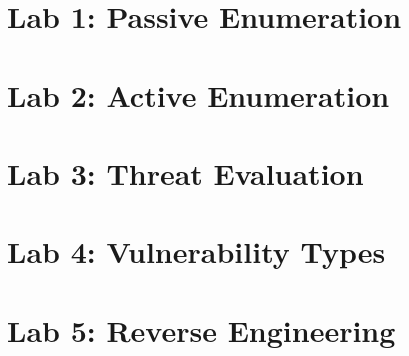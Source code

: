 \documentclass[oneside,openright,titlepage,numbers=noenddot,headinclude,footinclude=true,cleardoublepage=empty,listof=totoc,paper=a4,fontsize=11pt,english,BCOR=5mm]{scrreprt}
\begin{document}
  \frenchspacing
  \raggedbottom{}

  \pagestyle{plain}

  \singlespacing{}
  

  \onehalfspacing{}
  

  \cleardoublepage{}
  \pagestyle{scrheadings}
  \onehalfspacing{}
  \chapter{Lab 1: Passive Enumeration}\label{c:Lab-1}
  

  \chapter{Lab 2: Active Enumeration}\label{c:Lab-2}
  

  \chapter{Lab 3: Threat Evaluation}\label{c:Lab-3}
  

  \chapter{Lab 4: Vulnerability Types}\label{c:Lab-4}
  

  \chapter{Lab 5: Reverse Engineering}\label{c:Lab-5}
  





  \cleardoublepage{}
  \appendix

  \singlespacing{}
  
  \cleardoublepage{}
\end{document}
